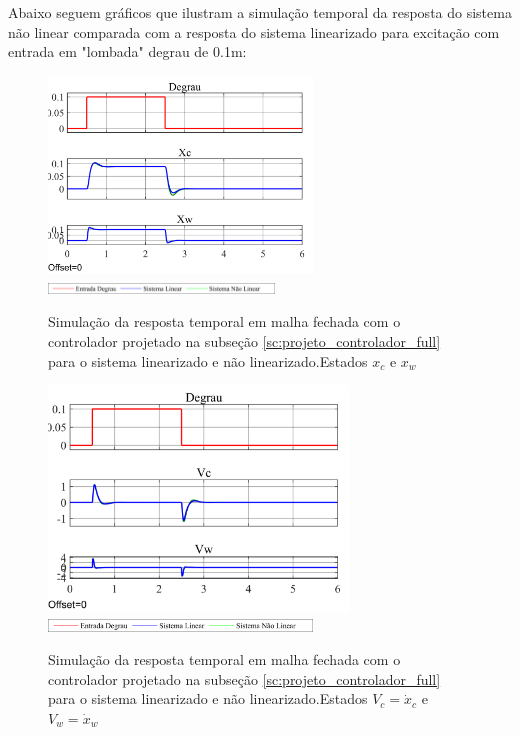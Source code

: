 \documentclass[a4paper]{ifacconf}
\begin{document}
    Abaixo seguem gráficos que ilustram a simulação temporal da resposta do sistema não linear comparada com a resposta do sistema linearizado para excitação com entrada em "lombada" degrau de 0.1m:
    
    \FloatBarrier
    \begin{figure}[htbp]
        \begin{centering}
            \includegraphics[width=7cm]{img/simulaca_temporal_nao_linear_realimentacao.png}
            \includegraphics[width=6cm]{img/sim_nao_linear_simulink_temp_leg.png}
            \caption{Simulação da resposta temporal em malha fechada com o controlador projetado na subseção \ref{sc:projeto_controlador_full} para o sistema linearizado e não linearizado.Estados $x_c$ e $x_w$ }
            \label{fig:simulaca_temporal_nao_linear_realimentacao}
        \end{centering}
    \end{figure}
    \FloatBarrier
	
	\FloatBarrier
    \begin{figure}[htbp]
        \begin{centering}
            \includegraphics[width=8cm]{img/simulaca_temporal_nao_linear_realimentacao_V.png}
            \includegraphics[width=7cm]{img/sim_nao_linear_simulink_temp_leg.png}
            \caption{Simulação da resposta temporal em malha fechada com o controlador projetado na subseção \ref{sc:projeto_controlador_full} para o sistema linearizado e não linearizado.Estados $V_c = \dot{x}_c$ e $V_w = \dot{x}_w$ }
            \label{fig:simulaca_temporal_nao_linear_realimentacao_V}
        \end{centering}
    \end{figure}
    \FloatBarrier
    
\end{document}
